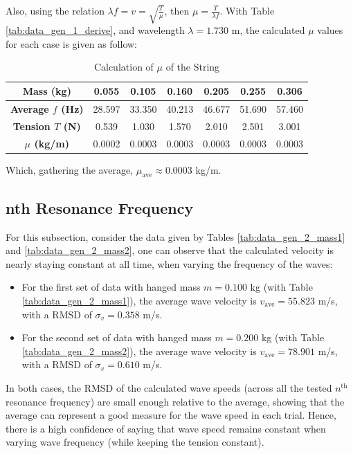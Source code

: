 \documentclass{article}
\begin{document}
Also, using the relation $\lambda f=v=\sqrt{\frac{T}{\mu}}$, then $\mu = \frac{T}{\lambda f}$. With Table \ref{tab:data_gen_1_derive}, and wavelength $\lambda=1.730$ m, the calculated $\mu$ values for each case is given as follow:
\begin{table}[h!]
    \centering
    \caption{Calculation of $\mu$ of the String}
    \begin{tabular}{c||cccccc}
        \toprule
        \textbf{Mass (kg)} & \textbf{0.055}& \textbf{0.105}& \textbf{0.160}& \textbf{0.205}& \textbf{0.255}& \textbf{0.306}\\
        \midrule
        \midrule
        \textbf{Average $f$ (Hz)} & 28.597 & 33.350 & 40.213 & 46.677 & 51.690 & 57.460\\
        \hline
        \textbf{Tension $T$ (N)} & 0.539 & 1.030 & 1.570 & 2.010 & 2.501 & 3.001\\
        \hline
        \textbf{$\mu$ (kg/m)} & 0.0002 & 0.0003 & 0.0003 & 0.0003 & 0.0003 & 0.0003\\
        \bottomrule
    \end{tabular}
    \label{tab:data_mu_exp1}
\end{table}
Which, gathering the average, $\mu_\text{ave}\approx 0.0003$ kg/m.

\hfil

\subsection{nth Resonance Frequency}
For this subsection, consider the data given by Tables \ref{tab:data_gen_2_mass1} and \ref{tab:data_gen_2_mass2}, one can observe that the calculated velocity is nearly staying constant at all time, when varying the frequency of the waves:
\begin{itemize}
    \item[1.] For the first set of data with hanged mass $m=0.100$ kg (with Table \ref{tab:data_gen_2_mass1}), the average wave velocity is $v_\text{ave} = 55.823$ m/s, with a RMSD of $\sigma_v = 0.358$ m/s.
    \item[2.] For the second set of data with hanged mass $m=0.200$ kg (with Table \ref{tab:data_gen_2_mass2}), the average wave velocity is $v_\text{ave} = 78.901$ m/s, with a RMSD of $\sigma_v = 0.610$ m/s. 
\end{itemize}
In both cases, the RMSD of the calculated wave speeds (across all the tested $n^\text{th}$ resonance frequency) are small enough relative to the average, showing that the average can represent a good measure for the wave speed in each trial. Hence, there is a high confidence of saying that wave speed remains constant when varying wave frequency (while keeping the tension constant).
\end{document}
